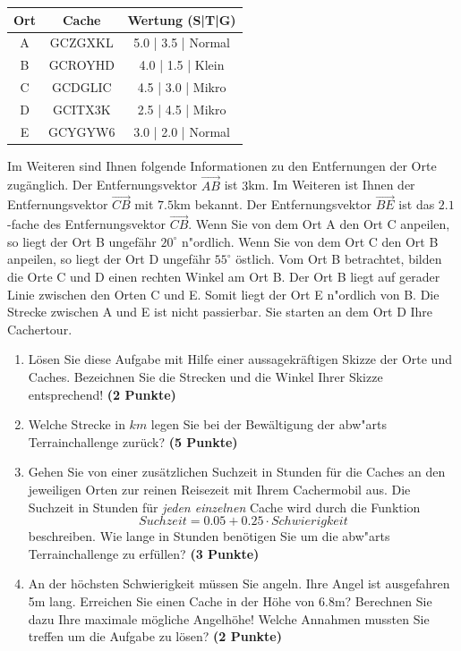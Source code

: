 \documentclass[a4paper, 9pt]{scrartcl}\usepackage[]{graphicx}\usepackage[]{xcolor}
\begin{document}
\begin{center}
  \begin{tabular}{ ccc }
    \toprule
    Ort & Cache & Wertung (S|T|G) \\
    \midrule
    A & GCZGXKL & 5.0 | 3.5 | Normal \\
    B & GCROYHD & 4.0 | 1.5 | Klein \\ 
    C & GCDGLIC & 4.5 | 3.0 | Mikro \\ 
    D & GCITX3K & 2.5 | 4.5 | Mikro \\ 
    E & GCYGYW6 & 3.0 | 2.0 | Normal \\     
 \bottomrule
\end{tabular}
\end{center}

Im Weiteren sind Ihnen folgende Informationen zu den Entfernungen der Orte
zug{\"a}nglich. Der Entfernungsvektor $\overrightarrow{AB}$ ist
$3$km. Im Weiteren ist Ihnen der Entfernungsvektor
$\overrightarrow{CB}$ mit $7.5$km bekannt. Der
Entfernungsvektor $\overrightarrow{BE}$ ist das $2.1$-fache
des Entfernungsvektor $\overrightarrow{CB}$. Wenn Sie von dem Ort A den Ort
C anpeilen, so liegt der Ort B ungef{\"a}hr $20^\circ$
n{"o}rdlich. Wenn Sie von dem Ort C den Ort B anpeilen, so liegt
der Ort D ungef{\"a}hr $55^\circ$ {\"o}stlich. Vom Ort B
betrachtet, bilden die Orte C und D einen rechten Winkel am Ort B. Der Ort
B liegt auf gerader Linie zwischen den Orten C und E. Somit liegt der Ort E
n{"o}rdlich von B. Die Strecke zwischen A und E ist nicht
passierbar. Sie starten an dem Ort D Ihre Cachertour. \\

\begin{enumerate}
\item L{\"o}sen Sie diese Aufgabe mit Hilfe einer aussagekr{\"a}ftigen Skizze der
  Orte und Caches. Bezeichnen Sie die Strecken und die Winkel Ihrer Skizze
  entsprechend! \textbf{(2 Punkte)}
\item Welche Strecke in $km$ legen Sie bei der Bew{\"a}ltigung der
  abw{"a}rts Terrainchallenge zur{\"u}ck? \textbf{(5
    Punkte)}
\item Gehen Sie von einer zus{\"a}tzlichen Suchzeit in Stunden f{\"u}r die
  Caches an den jeweiligen Orten zur reinen Reisezeit mit Ihrem Cachermobil
  aus. Die Suchzeit in Stunden f{\"u}r \textit{jeden einzelnen} Cache wird durch die
  Funktion
  \begin{equation*}
    Suchzeit = 0.05 + 0.25 \cdot Schwierigkeit
  \end{equation*}  
  beschreiben.  Wie lange in Stunden ben{\"o}tigen Sie um die
  abw{"a}rts Terrainchallenge zu erf{\"u}llen? \textbf{(3 Punkte)}
\item An der h{\"o}chsten Schwierigkeit m{\"u}ssen Sie angeln. Ihre Angel ist
  ausgefahren 5m lang. Erreichen Sie einen Cache in der H{\"o}he
  von 6.8m?  Berechnen Sie dazu Ihre maximale m{\"o}gliche
  Angelh{\"o}he! Welche Annahmen mussten Sie treffen um die Aufgabe zu l{\"o}sen? \textbf{(2 Punkte)} 
\end{enumerate}
\end{document}
